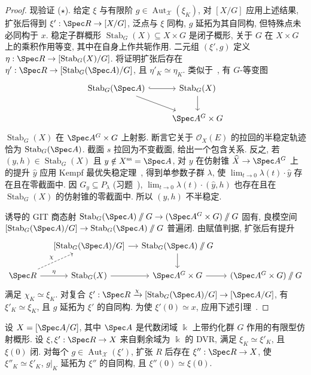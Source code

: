 \begin{proof}
现验证 ($\star$). 给定 $\xi$ 与有限阶 $g\in\operatorname{Aut}_{\mathcal X}(\xi_K)$, 对 $[X/G]$ 应用上述结果, 扩张后得到 $\xi':\Spec R\to[X/G]$, 泛点与 $\xi$ 同构, $g$ 延拓为其自同构, 但特殊点未必同构于 $x$. 稳定子群概形 $\operatorname{Stab}_G(X)\subseteq X\times G$ 是闭子概形, 关于 $G$ 在 $X\times G$ 上的乘积作用等变, 其中在自身上作共轭作用. 二元组 $(\xi',g)$ 定义 $\eta:\Spec R\to[\operatorname{Stab}_G(X)/G]$. 将证明扩张后存在 $\eta':\Spec R\to[\operatorname{Stab}_G(\Spec A)/G]$, 且 $\eta'_K\simeq\eta_K$. 类似于~, 有 $G$-等变图
\[\begin{tikzcd}[ampersand replacement=\&]\operatorname{Stab}_G(\Spec A)\arrow[r,hook]\arrow[dr]\&\operatorname{Stab}_G(X)\arrow[d]\\\&\Spec A^G\times G\end{tikzcd}\]
$\operatorname{Stab}_G(X)$ 在 $\Spec A^G\times G$ 上射影. 断言它关于 $\mathcal O_X(E)$ 的拉回的半稳定轨迹恰为 $\operatorname{Stab}_G(\Spec A)$. 截面 $s$ 拉回为不变截面, 给出一个包含关系. 反之, 若 $(y,h)\in\operatorname{Stab}_G(X)$ 且 $y\notin X^{\mathrm{ss}}=\Spec A$, 对 $y$ 在仿射锥 $\widehat X\to\Spec A^G$ 上的提升 $\widehat y$ 应用 Kempf 最优失稳定理~, 得到单参数子群 $\lambda$, 使 $\lim_{t\to0}\lambda(t)\cdot\widehat y$ 存在且在零截面中. 因 $G_y\subseteq P_\lambda$ (习题~), $\lim_{t\to0}\lambda(t)\cdot(\widehat y,h)$ 也存在且在 $\operatorname{Stab}_G(X)$ 的仿射锥的零截面中. 所以 $(y,h)$ 不半稳定.

诱导的 GIT 商态射 $\operatorname{Stab}_G(\Spec A)\sslash G\to(\Spec A^G\times G)\sslash G$ 固有, 良模空间 $[\operatorname{Stab}_G(\Spec A)/G]\to\operatorname{Stab}_G(\Spec A)\sslash G$ 普遍闭. 由赋值判据, 扩张后有提升
\[\begin{tikzcd}[ampersand replacement=\&,column sep=small]
\&{[\operatorname{Stab}_G(\Spec A)/G]}\arrow[r]\&\operatorname{Stab}_G(\Spec A)\sslash G\arrow[d]\&\\
\Spec R\arrow[r,"{\eta}"]\arrow[ur,dashed,"{\chi}"]\&\operatorname{Stab}_G(X)\arrow[r]\&\Spec A^G\times G\arrow[r]\&(\Spec A^G\times G)\sslash G
\end{tikzcd}\]
满足 $\chi_K\simeq\xi_K$. 对复合 $\xi':\Spec R\xrightarrow{\chi}[\operatorname{Stab}_G(\Spec A)/G]\to[\Spec A/G]$, 有 $\xi'_K\simeq\xi_K$, 且 $g$ 延拓为 $\xi'$ 的自同构. 为使 $\xi'(0)\simeq x$, 应用下述引理~.
\end{proof}
\begin{lemma}\label{src:7.10.27}
设 $\mathcal X=[\Spec A/G]$, 其中 $\Spec A$ 是代数闭域 $\Bbbk$ 上带约化群 $G$ 作用的有限型仿射概形. 设 $\xi,\xi':\Spec R\to\mathcal X$ 来自剩余域为 $\Bbbk$ 的 DVR, 满足 $\xi_K\simeq\xi'_K$, 且 $\xi(0)$ 闭. 对每个 $g\in\operatorname{Aut}_{\mathcal X}(\xi')$, 扩张 $R$ 后存在 $\xi'':\Spec R\to\mathcal X$, 使 $\xi''_K\simeq\xi'_K$, $g|_K$ 延拓为 $\xi''$ 的自同构, 且 $\xi''(0)\simeq\xi(0)$.
\end{lemma}
